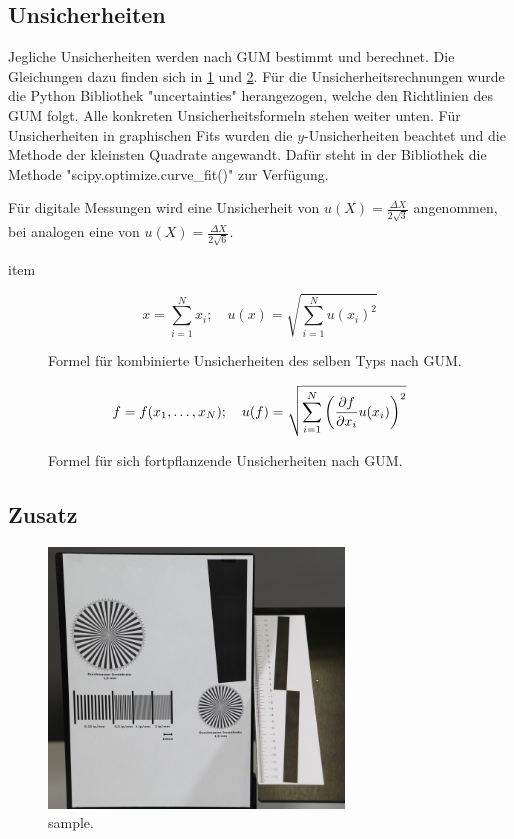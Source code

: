 \subsection{Unsicherheiten}\label{subsec:unc}

Jegliche Unsicherheiten werden nach GUM bestimmt und berechnet.
Die Gleichungen dazu finden sich in \ref{fig:GUM_combine} und \ref{fig:GUM_formula}.
Für die Unsicherheitsrechnungen wurde die Python Bibliothek "uncertainties" herangezogen, welche den Richtlinien des GUM folgt.
Alle konkreten Unsicherheitsformeln stehen weiter unten.
Für Unsicherheiten in graphischen Fits wurden die $y$-Unsicherheiten beachtet und die Methode der kleinsten Quadrate angewandt.
Dafür steht in der Bibliothek die Methode "scipy.optimize.curve\_fit()" zur Verfügung.

Für digitale Messungen wird eine Unsicherheit von $u(X) = \frac{\Delta X}{2\sqrt{3}}$ angenommen, bei analogen eine von $u(X) = \frac{\Delta X}{2\sqrt{6}}$.

\begin{description}
	\item[item] %
	
\end{description}
\begin{figure}[ht]
	\begin{equation*}	
		x = \sum_{i=1}^{N} x_i
		;\quad
		u(x) = \sqrt{\sum_{i = 1}^{N} u(x_i)^2}
	\end{equation*}
	\caption{Formel für kombinierte Unsicherheiten des selben Typs nach GUM.}
	\label{fig:GUM_combine}
\end{figure}

\begin{figure}[ht]
	\begin{align*}
		f = f(x_1, \dots , x_N)
		;\quad
		u(f) = \sqrt{\sum_{i = 1}^{N}\left(\pdv{f}{x_i} u(x_i)\right) ^2}
	\end{align*}
	\caption{Formel für sich fortpflanzende Unsicherheiten nach GUM.}
	\label{fig:GUM_formula}
\end{figure}

\subsection{Zusatz}\label{subsec:Zusatz}

\begin{figure}[ht]
	\centering
	\includegraphics[width=0.7\textwidth]{bilder/testbild.png}
	\caption{sample.\cite{WWU}}
	\label{fig:testbild}	
\end{figure}	